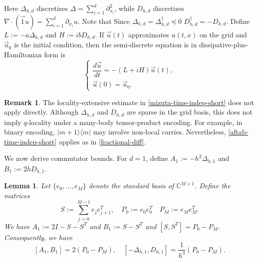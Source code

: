 \documentclass[10pt,reqno]{article}
\numberwithin{equation}{section}
\theoremstyle{plain}
\newtheorem{lem}[thm]{Lemma}
\theoremstyle{definition}
\newtheorem{remark}[thm]{Remark}
\begin{document}
Here \(\Delta_{h,d}\) discretizes \(\Delta=\sum_{i=1}^d\partial_{x_i}^2\), while \(D_{h,d}\) discretizes \(\nabla\cdot(\vec 1u)=\sum_{i=1}^d\partial_{x_i}u\). 
Note that  Since \(\Delta_{h,d}=\Delta_{h,d}^\dagger\preceq0\)  \(D_{h,d}^\dagger=-D_{h,d}\). 
 Define $L := -a\Delta_{h,d}$ and $H := ibD_{h,d}$.  If \(\vec u(t)\) approximates \(u(t,x)\) on the grid and \(\vec u_0\) is the initial condition, then the semi-discrete equation is in dissipative-plus-Hamiltonian form is
\begin{equation}\label{eq:generalized-heat-lchs-form}
\begin{cases} \dfrac{d\vec u}{dt} = -\left(L+iH\right) \vec u(t),\\ \vec u(0)=\vec u_0 . \end{cases}
\end{equation}

\begin{remark}
The locality-extensive estimate in \cref{mizuta-time-indep-short} does not apply directly. Although \(\Delta_{h,d}\) and \(D_{h,d}\) are sparse in the grid basis, this does not imply \(q\)-locality under a many-body tensor-product encoding. For example, in binary encoding, \(|m+1\rangle\langle m|\) may involve non-local carries. Nevertheless, \cref{aftab-time-indep-short} applies as in \cref{fractional-diff}.
\end{remark}

We now derive commutator bounds. For \(d=1\), define \(A_1:=-h^2\Delta_{h,1}\) and \(B_1:=2hD_{h,1}\).

\begin{lem}\label{lem:dirichlet-first-commutator-1d}
Let \(\{e_0,\dots,e_M\}\) denote the standard basis of \(\mathbb C^{M+1}\). Define the matrices 
\begin{equation}
S := \sum_{j=0}^{M-1} e_j e_{j+1}^T, \quad 
P_0:=e_0e_0^T  
\quad P_M:=e_Me_M^T.
\end{equation}
We have $A_1:=2I-S-S^T$ and $B_1:=S-S^T$ and $[S,S^T]=P_0-P_M$. Consequently, we have
\begin{equation}\label{eq:dirichlet-first-commutator-1d}
[A_1,B_1] = 2(P_0-P_M), \quad [-\Delta_{h,1},D_{h,1}] =\frac{1}{h^3}(P_0-P_M).
\end{equation}
\end{lem}
\end{document}
